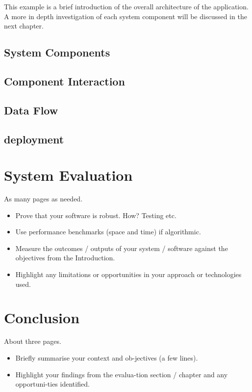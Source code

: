 This example is a brief introduction of the overall architecture of the application. A more in depth investigation of each system component will be discussed in the next chapter.

\section{System Components}

\section{Component Interaction}

\section{Data Flow}

\section{deployment}



\chapter{System Evaluation}
As many pages as needed.
\begin{itemize}
\item Prove that your software is robust. How? Testing etc. 
\item Use performance benchmarks (space and time) if algorithmic.
\item Measure the outcomes / outputs of your system / software against the objectives from the Introduction.
\item Highlight any limitations or opportunities in your approach or technologies used.
\end{itemize}

\chapter{Conclusion}
About three pages.

\begin{itemize}
\item Briefly summarise your context and ob-jectives (a few lines).
\item Highlight your findings from the evalua-tion section / chapter and any opportuni-ties identified.
\end{itemize}

